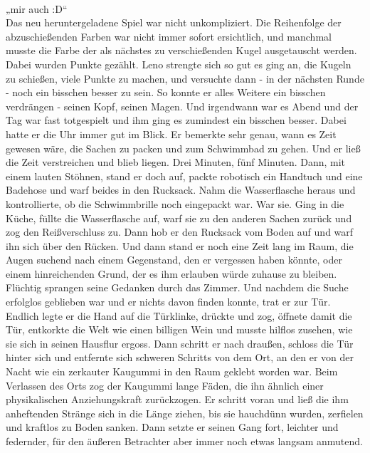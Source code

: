 \documentclass[ngerman,smalldemyvopaper,11pt,oneside,onecolumn,openright,extrafontsizes]{memoir}
\begin{document}
\vspace{0.5em} \\
„mir auch :D“
\vspace{0.5em} \\
Das neu heruntergeladene Spiel war nicht unkompliziert. Die Reihenfolge der abzuschießenden Farben war nicht immer sofort ersichtlich, und manchmal musste die Farbe der als nächstes zu verschießenden Kugel ausgetauscht werden. Dabei wurden Punkte gezählt. Leno strengte sich so gut es ging an, die Kugeln zu schießen, viele Punkte zu machen, und versuchte dann - in der nächsten Runde - noch ein bisschen besser zu sein. So konnte er alles Weitere ein bisschen verdrängen - seinen Kopf, seinen Magen. Und irgendwann war es Abend und der Tag war fast totgespielt und ihm ging es zumindest ein bisschen besser. Dabei hatte er die Uhr immer gut im Blick. Er bemerkte sehr genau, wann es Zeit gewesen wäre, die Sachen zu packen und zum Schwimmbad zu gehen. Und er ließ die Zeit verstreichen und blieb liegen. Drei Minuten, fünf Minuten. Dann, mit einem lauten Stöhnen, stand er doch auf, packte robotisch ein Handtuch und eine Badehose und warf beides in den Rucksack. Nahm die Wasserflasche heraus und kontrollierte, ob die Schwimmbrille noch eingepackt war. War sie. Ging in die Küche, füllte die Wasserflasche auf, warf sie zu den anderen Sachen zurück und zog den Reißverschluss zu. Dann hob er den Rucksack vom Boden auf und warf ihn sich über den Rücken. Und dann stand er noch eine Zeit lang im Raum, die Augen suchend nach einem Gegenstand, den er vergessen haben könnte, oder einem hinreichenden Grund, der es ihm erlauben würde zuhause zu bleiben. Flüchtig sprangen seine Gedanken durch das Zimmer. Und nachdem die Suche erfolglos geblieben war und er nichts davon finden konnte, trat er zur Tür. Endlich legte er die Hand auf die Türklinke, drückte und zog, öffnete damit die Tür, entkorkte die Welt wie einen billigen Wein und musste hilflos zusehen, wie sie sich in seinen Hausflur ergoss. Dann schritt er nach draußen, schloss die Tür hinter sich und entfernte sich schweren Schritts von dem Ort, an den er von der Nacht wie ein zerkauter Kaugummi in den Raum geklebt worden war. Beim Verlassen des Orts zog der Kaugummi lange Fäden, die ihn ähnlich einer physikalischen Anziehungskraft zurückzogen. Er schritt voran und ließ die ihm anheftenden Stränge sich in die Länge ziehen, bis sie hauchdünn wurden, zerfielen und kraftlos zu Boden sanken. Dann setzte er seinen Gang fort, leichter und federnder, für den äußeren Betrachter aber immer noch etwas langsam anmutend.
\end{document}
